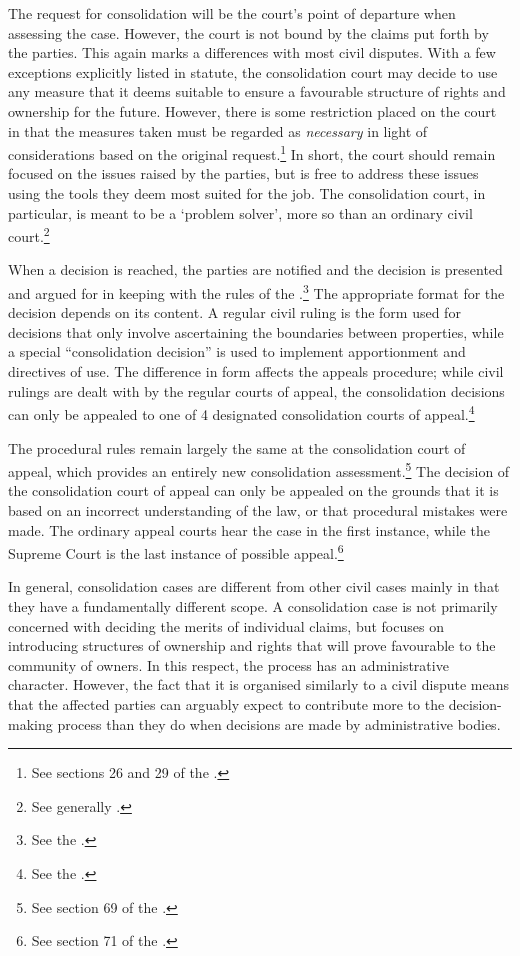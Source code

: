 The request for consolidation will be the court's point of departure when assessing the case. However, the court is not bound by the claims put forth by the parties. This again marks a differences with most civil disputes. With a few exceptions explicitly listed in statute, the consolidation court may decide to use any measure that it deems suitable to ensure a favourable structure of rights and ownership for the future. However, there is some restriction placed on the court in that the measures taken must be regarded as \emph{necessary} in light of considerations based on the original request.\footnote{See sections 26 and 29 of the \cite{lca79}.} In short, the court should remain focused on the issues raised by the parties, but is free to address these issues using the tools they deem most suited for the job. The consolidation court, in particular, is meant to be a `problem solver', more so than an ordinary civil court.\footnote{See generally \cite{rognes07}.}

When a decision is reached, the parties are notified and the decision is presented and argued for in keeping with the rules of the \cite{cda05}.\footnote{See the \dni\cite[7|22]{lca79}.} The appropriate format for the decision depends on its content. A regular civil ruling is the form used for decisions that only involve ascertaining the boundaries between properties, while a special ``consolidation decision'' is used to implement apportionment and directives of use. The difference in form affects the appeals procedure; while civil rulings are dealt with by the regular courts of appeal, the consolidation decisions can only be appealed to one of 4 designated consolidation courts of appeal.\footnote{See the \dni\cite[61]{lca79}.}

The procedural rules remain largely the same at the consolidation court of appeal, which provides an entirely new consolidation assessment.\footnote{See section 69 of the \cite{lca79}.} The decision of the consolidation court of appeal can only be appealed on the grounds that it is based on an incorrect understanding of the law, or that procedural mistakes were made. The ordinary appeal courts hear the case in the first instance, while the Supreme Court is the last instance of possible appeal.\footnote{See section 71 of the \cite{lca79}.}

In general, consolidation cases are different from other civil cases mainly in that they have a fundamentally different scope. A consolidation case is not primarily concerned with deciding the merits of individual claims, but focuses on introducing structures of ownership and rights that will prove favourable to the community of owners. In this respect, the process has an administrative character. However, the fact that it is organised similarly to a civil dispute means that the affected parties can arguably expect to contribute more to the decision-making process than they do when decisions are made by administrative bodies.


